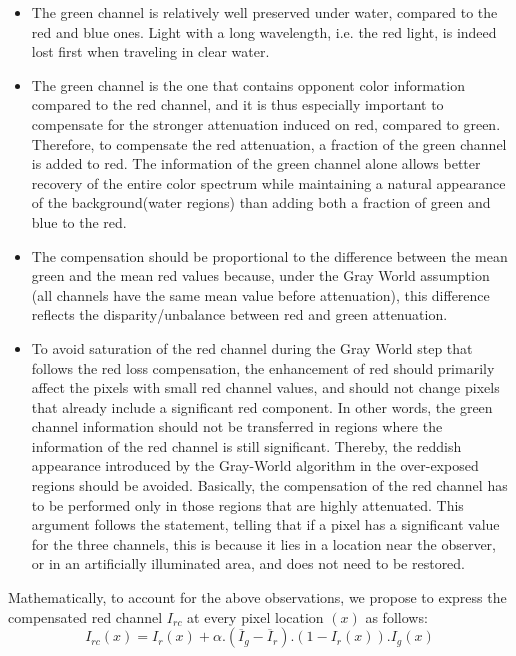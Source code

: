 \documentclass[hidelinks, 12pt]{report}
\begin{document}
\begin{itemize}
\item{The green channel is relatively well preserved under water, compared to the red and blue ones. Light with a long wavelength, i.e. the red light, is indeed lost first when traveling in clear water.}
\item{The green channel is the one that contains opponent color information compared to the red channel, and it is thus especially important to compensate for the stronger attenuation induced on red, compared to green. Therefore, to compensate the red attenuation, a fraction of the green channel is added to red. The information of the green channel alone allows better recovery of the entire color spectrum while maintaining a natural appearance of the background(water regions) than adding both a fraction of green and blue to the red.}
\item{The compensation should be proportional to the difference between the mean green and the mean red values because, under the Gray World assumption (all channels have the same mean value before attenuation), this difference reflects the disparity/unbalance between red and green attenuation.}
\item{To avoid saturation of the red channel during the Gray World step that follows the red loss compensation, the enhancement of red should primarily affect the pixels with small red channel values, and should not change pixels that already include a significant red component. In other words, the green channel information should not be transferred in regions where the information of the red channel is still significant. Thereby, the reddish appearance introduced by the Gray-World algorithm in the over-exposed regions should be avoided. Basically, the compensation of the red channel has to be performed only in those regions that are highly attenuated. This argument follows the statement\cite{ag}, telling that if a pixel has a significant value for the three channels, this is because it lies in a location near the observer, or in an artificially illuminated area, and does not need to be restored.}
\end{itemize}
Mathematically, to account for the above observations, we propose to express the compensated red channel $I_{rc}$ at every pixel location $(x)$ as follows:
\begin{equation}
I_{rc}(x)=I_r(x)+\alpha.(\overline{I}_g-\overline{I}_r).(1-I_r(x)).I_g(x)
\end{equation}
\end{document}
